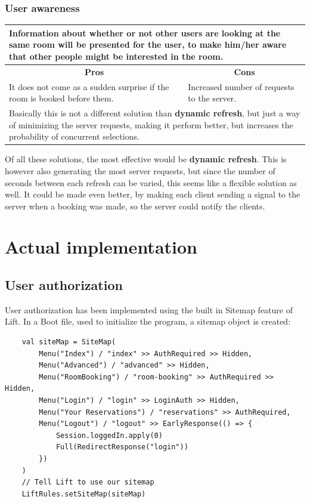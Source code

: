 \subsubsection*{User awareness}
\begin{tabular}{|p{6cm}|p{6cm}|}
\hline
	\multicolumn{2}{|p{12cm}|}{Information about whether or not other users are looking at the same room will be presented for the user, to make him/her aware that other people might be interested in the room. } \\ \hline \hline
	\multicolumn{1}{|c|}{\textbf{Pros}} & \multicolumn{1}{c|}{\textbf{Cons}} \\ \hline
	It does not come as a sudden surprise if the room is booked before them. & Increased number of requests to the server. \\ \hline
	\multicolumn{2}{|p{12cm}|}{Basically this is not a different solution than \textbf{dynamic refresh}, but just a way of minimizing the server requests, making it perform better, but increases the probability of concurrent selections.} \\
	\hline
\end{tabular}

Of all these solutions, the most effective would be \textbf{dynamic refresh}. This is however also generating the most server requests, but since the number of seconds between each refresh can be varied, this seems like a flexible solution as well. It could be made even better, by making each client sending a signal to the server when a booking was made, so the server could notify the clients.\\

\section{Actual implementation}
\label{sec:actual_implementation}

\subsection{User authorization}
User authorization has been implemented using the built in Sitemap feature of Lift. In a Boot file, used to initialize the program, a sitemap object is created:

\begin{verbatim}
    val siteMap = SiteMap(
        Menu("Index") / "index"	>> AuthRequired >> Hidden,
        Menu("Advanced") / "advanced" >> Hidden,
        Menu("RoomBooking") / "room-booking" >> AuthRequired >> Hidden,
        Menu("Login") / "login" >> LoginAuth >> Hidden,
        Menu("Your Reservations") / "reservations" >> AuthRequired,
        Menu("Logout") / "logout" >> EarlyResponse(() => {
            Session.loggedIn.apply(0)
            Full(RedirectResponse("login"))
        })
    )
    // Tell Lift to use our sitemap
    LiftRules.setSiteMap(siteMap)
\end{verbatim}

